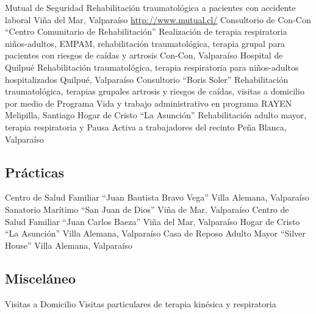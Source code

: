 \documentclass[11pt,a4paper,sans]{moderncv}
\begin{document}
        {Mutual de Seguridad}
        {Rehabilitación traumatológica a pacientes con accidente laboral}
        {}
        {Viña del Mar, Valparaíso}
        {\url{http://www.mutual.cl/}}
        {Consultorio de Con-Con ``Centro Comunitario de Rehabilitación''}
        {Realización de terapia respiratoria niños-adultos, EMPAM, rehabilitación traumatológica, terapia grupal para pacientes con riesgos de caídas y artrosis}
        {}
        {}
        {Con-Con, Valparaíso}
        {Hospital de Quilpué}
        {Rehabilitación traumatológica, terapia respiratoria para niños-adultos hospitalizados}
        {}
        {}
        {Quilpué, Valparaíso}
        {Consultorio ``Boris Soler''}
        {Rehabilitación traumatológica, terapias grupales artrosis y riesgos de caídas, visitas a domicilio por medio de Programa Vida y trabajo administrativo en programa RAYEN}
        {}
        {}
        {Melipilla, Santiago}
        {Hogar de Cristo ``La Asunción''}
        {Rehabilitación adulto mayor, terapia respiratoria y Pausa Activa a trabajadores del recinto}
        {}
        {}
        {Peña Blanca, Valparaíso}
        

\newpage
\subsection{Prácticas}

\cventry{}
        {Centro de Salud Familiar ``Juan Bautista Bravo Vega''}
        {}
        {}
        {Villa Alemana, Valparaíso}
        {}
\cventry{}
        {Sanatorio Marítimo ``San Juan de Dios''}
        {}
        {}
        {Viña de Mar, Valparaíso}
        {}
\cventry{}
        {Centro de Salud Familiar ``Juan Carlos Baeza''}
        {}
        {}
        {Viña del Mar, Valparaíso}
        {}
\cventry{}
        {Hogar de Cristo ``La Asunción''}
        {}
        {}
        {Villa Alemana, Valparaíso}
        {}
\cventry{}
        {Casa de Reposo Adulto Mayor ``Silver House''}
        {}
        {}
        {Villa Alemana, Valparaíso}
        {}
        
        
\subsection{Misceláneo}


\cventry{}
        {Visitas a Domicilio}
        {Visitas particulares de terapia kinésica y respiratoria}
        {}
        {}
        {}
        
\end{document}
